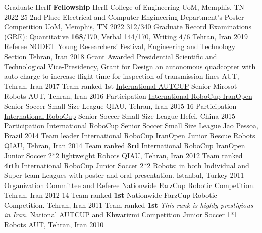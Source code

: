 


\begin{cvhonors}

  \cvhonor
  {Graduate Herff \textbf{Fellowship}}
  {Herff College of Engineering}
  {UoM, Memphis, TN}
  {2022-25}
  \cvhonor
    {2nd Place}
    {Electrical and Computer Engineering Department's Poster Competition}
    {UoM, Memphis, TN}
	{2022}
  \cvhonor
    {312/340} %
    {Graduate Record Examinations (GRE): Quantitative \textbf{168}/170, Verbal 144/170, Writing \textbf{4}/6} %
    {Tehran, Iran} %
    {2019} %
     \cvhonor
  {Referee}
  {NODET Young Researchers’ Festival, Engineering and Technology Section}
  {Tehran, Iran}
	{2018}
  \cvhonor
    {Grant Awarded} %
    {Presidential Scientific and Technological Vice-Presidency, Grant for Design an autonomous quadcopter with auto-charge to increase flight time for inspection of transmission lines} %
    {AUT, Tehran, Iran} %
    {2017} %
  \cvhonor
      {Team ranked 1st}
      {\href{http://autcup.aut.ac.ir/2018/visitorpages/default.aspx?itemid=3}{International AUTCUP} Senior Mirosot Robots}
      {AUT, Tehran, Iran}
	   {2016}
  \cvhonor
    {Participation}
    {\href{https://en.wikipedia.org/wiki/IranOpen}{International RoboCup IranOpen} Senior Soccer Small Size League}
    {QIAU, Tehran, Iran}
	{2015-16}
  \cvhonor
    {Participation}
    {\href{https://en.wikipedia.org/wiki/RoboCup}{International RoboCup} Senior Soccer Small Size League}
    {Hefei, China}
	{2015}
  \cvhonor
    {Participation}
    {International RoboCup Senior Soccer Small Size League}
    {Jao Pessoa, Brazil}
	{2014}
  \cvhonor
    {Team leader}
    {International RoboCup IranOpen Junior Rescue Robots}
    {QIAU, Tehran, Iran}
	{2014}
  \cvhonor
      {Team ranked \textbf{3rd}}
      {International RoboCup IranOpen Junior Soccer 2*2 lightweight Robots}
      {QIAU, Tehran, Iran}
        {2012}
   \cvhonor
   {Team ranked \textbf{4rth}}
    {International RoboCup Junior Soccer 2*2 Robots: in both Individual and Super-team Leagues with poster and oral presentation.}
    {Istanbul, Turkey}
	{2011}
  \cvhonor
    {Organization Committee and Referee}
    {Nationwide FarzCup Robotic Competition.}
    {Tehran, Iran}
    {2012-14}
  \cvhonor
    {Team ranked \textbf{1st}}
    {Nationwide FarzCup Robotic Competition.}
    {Tehran, Iran}
    {2011}
  \cvhonor
  {Team ranked \textbf{1st}}
  {\textit{This rank is highly prestigious in Iran.} National AUTCUP and \href{https://en.wikipedia.org/wiki/Khwarizmi_International_Award}{Khwarizmi} Competition Junior Soccer 1*1 Robots}
  {AUT, Tehran, Iran}
	{2010}
\end{cvhonors}